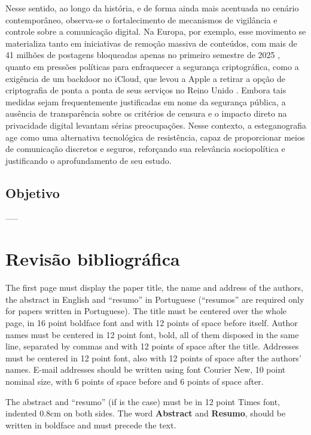 \documentclass[12pt]{article}
\begin{document}
Nesse sentido, ao longo da história, e de forma ainda mais acentuada no cenário
contemporâneo, observa-se o fortalecimento de mecanismos de vigilância e
controle sobre a comunicação digital. Na Europa, por exemplo, esse movimento se
materializa tanto em iniciativas de remoção massiva de conteúdos, com mais de
41 milhões de postagens bloqueadas apenas no primeiro semestre de 2025
\cite{poder3602025}, quanto em pressões políticas para enfraquecer a segurança
criptográfica, como a exigência de um backdoor no iCloud, que levou a Apple a
retirar a opção de criptografia de ponta a ponta de seus serviços no Reino
Unido \cite{guardian2025}. Embora tais medidas sejam frequentemente
justificadas em nome da segurança pública, a ausência de transparência sobre os
critérios de censura e o impacto direto na privacidade digital levantam sérias
preocupações. Nesse contexto, a esteganografia age como uma alternativa
tecnológica de resistência, capaz de proporcionar meios de comunicação
discretos e seguros, reforçando sua relevância sociopolítica e justificando o
aprofundamento de seu estudo.

\subsection{Objetivo}

-----

\section{Revisão bibliográfica} \label{sec:firstpage}

The first page must display the paper title, the name and address of the
authors, the abstract in English and ``resumo'' in Portuguese (``resumos'' are
required only for papers written in Portuguese). The title must be centered
over the whole page, in 16 point boldface font and with 12 points of space
before itself. Author names must be centered in 12 point font, bold, all of
them disposed in the same line, separated by commas and with 12 points of space
after the title. Addresses must be centered in 12 point font, also with 12
points of space after the authors' names. E-mail addresses should be written
using font Courier New, 10 point nominal size, with 6 points of space before
and 6 points of space after.

The abstract and ``resumo'' (if is the case) must be in 12 point Times font,
indented 0.8cm on both sides. The word \textbf{Abstract} and \textbf{Resumo},
should be written in boldface and must precede the text.
\end{document}
